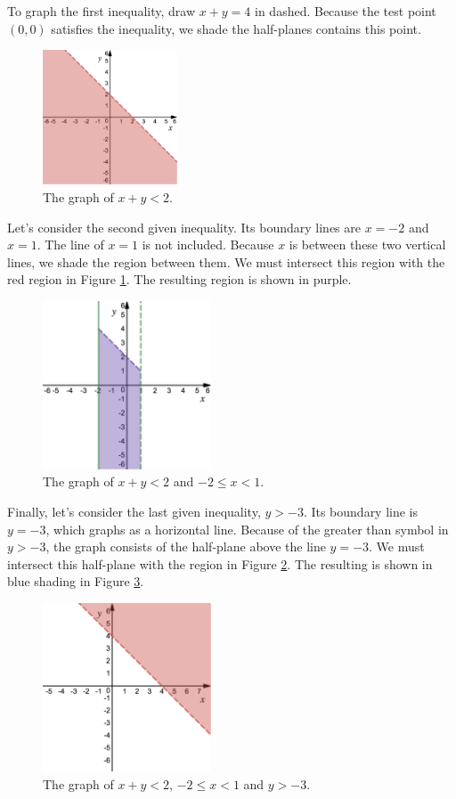 To graph the first inequality, draw $x+y=4$ in dashed. Because the test point $(0,0)$ satisfies the inequality, we shade the half-planes contains this point.
% 
\begin{figure}[H]
 \includegraphics[width=4cm]{pics/pic6.png}
 \centering
  \caption{The graph of $x+y<2$.}
  \label{fig:fig_7}
\end{figure}
% 
Let's consider the second given inequality. Its boundary lines are $x=-2$ and $x=1$. The line of $x=1$ is not included. Because $x$ is between these two vertical lines, we shade the region between them. We must intersect this region with the red region in Figure \ref{fig:fig_7}. The resulting region is shown in purple.
% 
\begin{figure}[H]
 \includegraphics[width=5cm]{pics/pic7.png}
 \centering
  \caption{The graph of $x+y<2$ and $-2\leq x <1$.}
  \label{fig:fig_8}
\end{figure}
% 
Finally, let's consider the last given inequality, $y>-3$. Its boundary line is $y=-3$, which graphs as a horizontal line. Because of the greater than symbol in $y>-3$, the graph consists of the half-plane above the line $y=-3$. We must intersect this half-plane with the region in Figure \ref{fig:fig_8}. The resulting is shown in blue shading in Figure \ref{fig:fig_9}.
% 
\begin{figure}[H]
 \includegraphics[width=5cm]{pics/pic3.png}
 \centering
  \caption{The graph of $x+y<2$, $-2\leq x <1$ and $y>-3$.}
  \label{fig:fig_9}
\end{figure}








